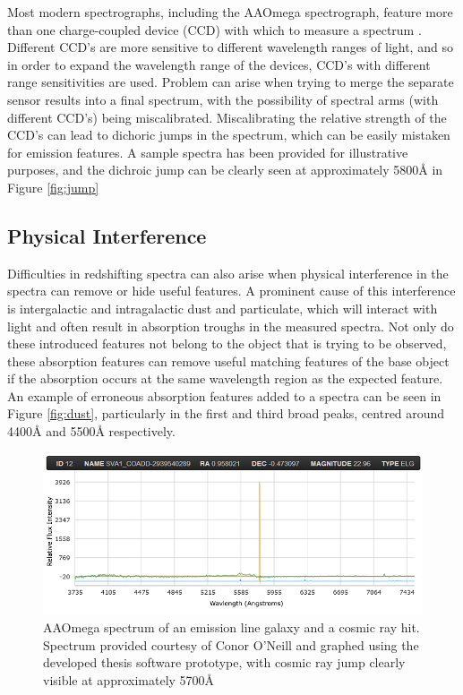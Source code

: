 \documentclass[titlesmallcaps, examinerscopy, copyrightpage]{uqthesis}
\begin{document}
Most modern spectrographs, including the AAOmega spectrograph, feature more than one charge-coupled device (CCD) with which to measure a spectrum \cite{aaomega}. Different CCD's are more sensitive to different wavelength ranges of light, and so in order to expand the wavelength range of the devices, CCD's with different range sensitivities are used. Problem can arise when trying to merge the separate sensor results into a final spectrum, with the possibility of spectral arms (with different CCD's) being miscalibrated. Miscalibrating the relative strength of the CCD's can lead to dichoric jumps in the spectrum, which can be easily mistaken for emission features. A sample spectra has been provided for illustrative purposes, and the dichroic jump can be clearly seen at approximately 5800{\AA} in Figure \ref{fig:jump}


\subsection{Physical Interference}

Difficulties in redshifting spectra can also arise when physical interference in the spectra can remove or hide useful features. A prominent cause of this interference is intergalactic and intragalactic dust and particulate, which will interact with light and often result in absorption troughs in the measured spectra. Not only do these introduced features not belong to the object that is trying to be observed, these absorption features can remove useful matching features of the base object if the absorption occurs at the same wavelength region as the expected feature. An example of erroneous absorption features added to a spectra can be seen in Figure \ref{fig:dust}, particularly in the first and third broad peaks, centred around 4400{\AA} and 5500{\AA} respectively.




\begin{figure}[ht!]
\includegraphics[width=1\textwidth]{images/CosmicRay.PNG} 
\centering
\caption{AAOmega spectrum of an emission line galaxy and a cosmic ray hit. Spectrum provided courtesy of Conor O'Neill and graphed using the developed thesis software prototype, with cosmic ray jump clearly visible at approximately 5700{\AA}}
\label{fig:cosmic}
\end{figure}
\end{document}
